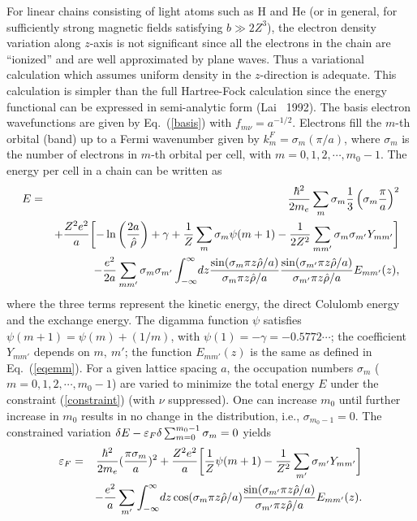 For linear chains consisting of light atoms such as H and He (or in general,
for sufficiently strong magnetic fields satisfying $b\gg 2Z^3$),
the electron density variation along $z$-axis is not significant since all the
electrons in the chain are ``ionized'' and are well approximated by plane
waves. Thus a variational calculation which assumes uniform density in the 
$z$-direction is adequate. This calculation is simpler than the full
Hartree-Fock calculation since the energy functional can be expressed in 
semi-analytic form (Lai \etal~1992). The basis electron wavefunctions are
given by Eq.~(\ref{basis}) with $f_{m\nu}=a^{-1/2}$. Electrons fill the
$m$-th orbital (band) up to a Fermi wavenumber given by $k_m^F=\sigma_m
(\pi/a)$, where $\sigma_m$ is the number of electrons in $m$-th orbital per
cell, with $m=0,1,2,\cdots,m_0-1$. The energy per cell in a chain can be
written as
\begin{eqnarray}
E = && {\hbar^2 \over 2 m_e} \sum_m \sigma_m 
{1 \over 3} \left(\sigma_m {\pi \over a}\right)^2 \nonumber \\
&&+ {Z^2 e^2 \over a}
\biggl [-\ln \left({2 a \over \hat \rho}\right) 
+ \gamma + {1 \over Z} \sum_m \sigma_m \psi (m+1)-
{1 \over 2 Z^2} \sum _{mm'} \sigma_m \sigma_{m'} Y_{mm'}\biggr ] \nonumber \\
&& -{e^2 \over 2 a} \sum_{mm'} \sigma_m \sigma_{m'}
\int_{-\infty}^{\infty}\! dz 
{\sin (\sigma_m \pi z \hat \rho /a) \over \sigma_m \pi z \hat \rho /a}
{\sin (\sigma_{m'} \pi z \hat \rho/a) \over \sigma_{m'} \pi z \hat \rho/a}
E_{mm'}(z),
\end{eqnarray}
where the three terms represent the kinetic energy, the direct 
Colulomb energy and the exchange energy. The digamma
function $\psi$ satisfies $\psi(m+1)=\psi(m)+(1/m)$, with $\psi(1)=-\gamma
=-0.5772\cdots$; the coefficient $Y_{mm'}$ depends on $m,~m'$;
the function $E_{mm'}(z)$ is the same as defined in Eq.~(\ref{eqemm}).
For a given lattice spacing $a$, the occupation numbers
$\sigma_m$ ($m=0,1,2,\cdots,m_0-1$) are varied to minimize the total 
energy $E$ under the constraint (\ref{constraint}) (with $\nu$ suppressed).
One can increase $m_0$ until further increase in $m_0$ results in no change 
in the distribution, i.e., $\sigma_{m_0-1}=0$. 
The constrained variation 
$\delta E - {\varepsilon}_F \delta \sum_{m=0}^{m_0-1} \sigma _m =0$ yields
\begin{eqnarray}
{\varepsilon}_F &=&{\hbar^2 \over 2 m_e} ({\pi \sigma_m \over a})^2 +
{Z^2 e^2 \over a} \biggl [{1 \over Z} \psi(m+1)-{1 \over Z^2}
\sum_{m'} \sigma_{m'} Y_{mm'} \biggr ] \nonumber \\
&& -{e^2 \over a} \sum_{m'} \int_{-\infty}^{\infty}\! dz
\cos (\sigma_m \pi z \hat \rho/a) 
{\sin (\sigma_{m'} \pi z \hat \rho/a) \over \sigma_{m'} \pi z \hat \rho/a} 
E_{mm'}(z). 
\label{efequal}\end{eqnarray}
